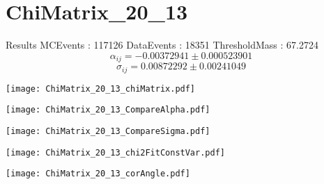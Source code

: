 \documentclass[a4paper,12pt]{article}
\begin{document}
\section{ChiMatrix\_20\_13}
\begin{minipage}{0.49\linewidth} Results \newline
MCEvents : 117126\newline
DataEvents : 18351 \newline
ThresholdMass : 67.2724\\
$$\alpha_{ij} = -0.00372941\pm 0.000523901$$
$$\sigma_{ij} = 0.00872292\pm 0.00241049$$
\end{minipage}\hfill
\begin{minipage}{0.49\linewidth} 
\texttt{[image: ChiMatrix\_20\_13\_chiMatrix.pdf]}\\
\end{minipage}
\hfill
\begin{minipage}{0.49\linewidth} 
\texttt{[image: ChiMatrix\_20\_13\_CompareAlpha.pdf]}\\
\end{minipage}
\hfill
\begin{minipage}{0.49\linewidth} 
\texttt{[image: ChiMatrix\_20\_13\_CompareSigma.pdf]}\\
\end{minipage}
\begin{minipage}{0.49\linewidth} 
\texttt{[image: ChiMatrix\_20\_13\_chi2FitConstVar.pdf]}\\
\end{minipage}
\hfill
\begin{minipage}{0.49\linewidth} 
\texttt{[image: ChiMatrix\_20\_13\_corAngle.pdf]}\\
\end{minipage}
\end{document}
